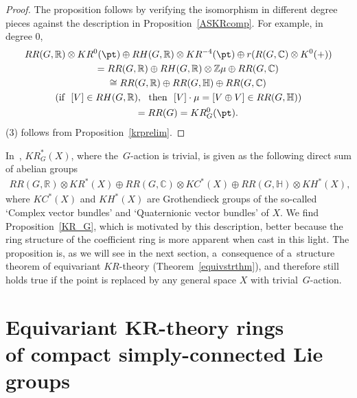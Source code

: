 \begin{proof}
The proposition
follows by verifying the isomorphism in dif\/ferent degree pieces against the description in
Proposition~\ref{ASKRcomp}.
For example, in degree 0,
\begin{gather*}
RR(G, \mathbb{R})\otimes KR^0(\pt)\oplus RH(G, \mathbb{R})\otimes KR^{-4}(\pt)\oplus r(R(G,
\mathbb{C})\otimes K^0(+))
\\
\qquad=RR(G, \mathbb{R})\oplus RH(G, \mathbb{R})\otimes \mathbb{Z}\mu\oplus RR(G, \mathbb{C})
\\
\qquad
\cong RR(G, \mathbb{R})\oplus RR(G, \mathbb{H})\oplus RR(G, \mathbb{C})
\\
(\text{if} \ \ [V]\in RH(G, \mathbb{R}),\ \ \text{then} \ \ [V]\cdot\mu=[V\oplus V]\in RR(G, \mathbb{H}))
\\
\qquad=RR(G)
=KR^0_G(\pt).
\end{gather*}
(3) follows from Proposition~\ref{krprelim}.
\end{proof}
\begin{Remark}
In~\cite{AS}, $KR_G^*(X)$, where the~$G$-action is trivial, is given as the following direct sum of abelian groups
\begin{gather*}
RR(G, \mathbb{R})\otimes KR^*(X)\oplus RR(G, \mathbb{C})\otimes KC^*(X)\oplus RR(G, \mathbb{H})\otimes KH^*(X),
\end{gather*}
where $KC^*(X)$ and $KH^*(X)$ are Grothendieck groups of the so-called `Complex vector bundles' and `Quaternionic vector
bundles' of $X$.
We f\/ind Proposition~\ref{KR_G}, which is motivated by this description, better because the ring structure of the
coef\/f\/icient ring is more apparent when cast in this light.
The proposition
is, as we will see in the next section, a~consequence of a~structure theorem of equivariant $KR$-theory
(Theorem~\ref{equivstrthm}), and therefore still holds true if the point is replaced by any general space $X$ with
trivial~$G$-action.
\end{Remark}

\section[Equivariant $KR$-theory rings of compact simply-connected Lie groups]{Equivariant
$\boldsymbol{KR}$-theory rings \\ of compact simply-connected Lie groups}\label{Section4}

